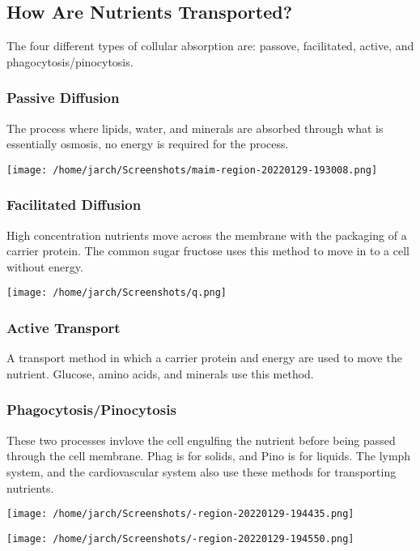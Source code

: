 \documentclass[letterpaper, 11pt]{article}
\begin{document}
\subsection{How Are Nutrients Transported?}
\label{sec:org8fbca72}
The four different types of collular absorption are: passove, facilitated, active, and phagocytosis/pinocytosis.\\
\subsubsection{Passive Diffusion}
\label{sec:org46e0831}
The process where lipids, water, and minerals are absorbed through what is essentially osmosis, no energy is required for the process.\\
\begin{center}
\texttt{[image: /home/jarch/Screenshots/maim-region-20220129-193008.png]}
\end{center}
\subsubsection{Facilitated Diffusion}
\label{sec:org976303f}
High concentration nutrients move across the membrane with the packaging of a carrier protein. The common sugar fructose uses this method to move in to a cell without energy.\\
\begin{center}
\texttt{[image: /home/jarch/Screenshots/q.png]}
\end{center}
\subsubsection{Active Transport}
\label{sec:orgf836391}
A transport method in which a carrier protein and energy are used to move the nutrient. Glucose, amino acids, and minerals use this method.\\
\subsubsection{Phagocytosis/Pinocytosis}
\label{sec:orgf054a5e}
These two processes invlove the cell engulfing the nutrient before being passed through the cell membrane. Phag is for solids, and Pino is for liquids. The lymph system, and the cardiovascular system also use these methods for transporting nutrients.\\
\begin{center}
\texttt{[image: /home/jarch/Screenshots/-region-20220129-194435.png]}
\end{center}
\begin{center}
\texttt{[image: /home/jarch/Screenshots/-region-20220129-194550.png]}
\end{center}
\end{document}
